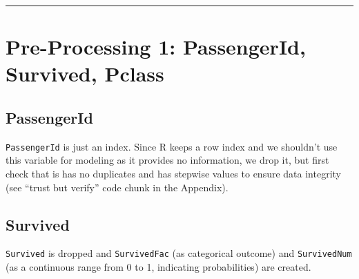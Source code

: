 \documentclass[]{article}
\newenvironment{Shaded}{\begin{snugshade}}{\end{snugshade}}
\newcommand{\KeywordTok}[1]{\textcolor[rgb]{0.13,0.29,0.53}{\textbf{#1}}}
\newcommand{\DataTypeTok}[1]{\textcolor[rgb]{0.13,0.29,0.53}{#1}}
\newcommand{\DecValTok}[1]{\textcolor[rgb]{0.00,0.00,0.81}{#1}}
\newcommand{\StringTok}[1]{\textcolor[rgb]{0.31,0.60,0.02}{#1}}
\newcommand{\CommentTok}[1]{\textcolor[rgb]{0.56,0.35,0.01}{\textit{#1}}}
\newcommand{\OtherTok}[1]{\textcolor[rgb]{0.56,0.35,0.01}{#1}}
\newcommand{\OperatorTok}[1]{\textcolor[rgb]{0.81,0.36,0.00}{\textbf{#1}}}
\newcommand{\NormalTok}[1]{#1}
\begin{document}
\begin{center}\rule{0.5\linewidth}{\linethickness}\end{center}

\hypertarget{preprocess1-link}{\section{Pre-Processing 1: PassengerId,
Survived, Pclass}\label{preprocess1-link}}

\subsection{PassengerId}\label{passengerid}

\texttt{PassengerId} is just an index. Since R keeps a row index and we
shouldn't use this variable for modeling as it provides no information,
we drop it, but first check that is has no duplicates and has stepwise
values to ensure data integrity (see ``trust but verify'' code chunk in
the Appendix).

\subsection{Survived}\label{survived}

\texttt{Survived} is dropped and \texttt{SurvivedFac} (as categorical
outcome) and \texttt{SurvivedNum} (as a continuous range from 0 to 1,
indicating probabilities) are created.

\begin{Shaded}
\end{Shaded}
\end{document}
